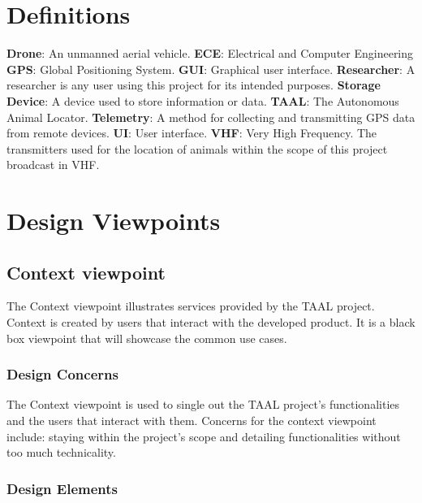 \documentclass[onecolumn, draftclsnofoot,10pt, compsoc]{IEEEtran}
\begin{document}
\section{Definitions}
\textbf{Drone}: An unmanned aerial vehicle. \newline
\textbf{ECE}: Electrical and Computer Engineering \newline
\textbf{GPS}: Global Positioning System. \newline
\textbf{GUI}: Graphical user interface. \newline
\textbf{Researcher}: A researcher is any user using this project for its intended purposes. \newline
\textbf{Storage Device}: A device used to store information or data. \newline
\textbf{TAAL}: The Autonomous Animal Locator. \newline
\textbf{Telemetry}: A method for collecting and transmitting GPS data from remote devices. \newline
\textbf{UI}: User interface. \newline
\textbf{VHF}: Very High Frequency. The transmitters used for the location of animals within the scope of this project broadcast in VHF.\newline


\section{Design Viewpoints}

\subsection{Context viewpoint}

The Context viewpoint illustrates services provided by the TAAL project.
Context is created by users that interact with the developed product.
It is a black box viewpoint that will showcase the common use cases.

\subsubsection{Design Concerns}

The Context viewpoint is used to single out the TAAL project's functionalities and the users that interact with them.
Concerns for the context viewpoint include: staying within the project's scope and detailing functionalities without too much technicality.

\subsubsection{Design Elements}
\end{document}
